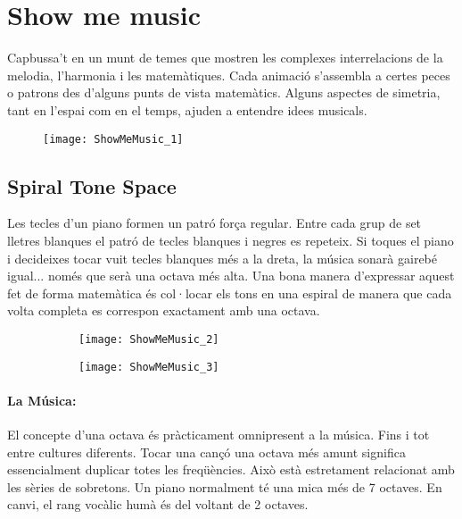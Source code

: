 \section{Show me music}
Capbussa't en un munt de temes que mostren les complexes interrelacions de la melodia, l'harmonia i les matemàtiques. Cada animació s'assembla a certes peces o patrons des d'alguns punts de vista matemàtics. Alguns aspectes de simetria, tant en l'espai com en el temps, ajuden a entendre idees musicals.

\begin{figure}[!h]
\centering
\texttt{[image: ShowMeMusic\_1]}
\end{figure}

\subsection{Spiral Tone Space}
Les tecles d'un piano formen un patró força regular. Entre cada grup de set lletres blanques el patró de tecles blanques i negres es repeteix. Si toques el piano i decideixes tocar vuit tecles blanques més a la dreta, la música sonarà gairebé igual... només que serà una octava més alta. Una bona manera d'expressar aquest fet de forma matemàtica és col·locar els tons en una espiral de manera que cada volta completa es correspon exactament amb una octava.

\begin{figure}[h]
\centering
\begin{subfigure}{0.45\textwidth}
\centering
\texttt{[image: ShowMeMusic\_2]}
\end{subfigure}
\begin{subfigure}{0.45\textwidth}
\centering
\texttt{[image: ShowMeMusic\_3]}
\end{subfigure}
\end{figure}


\paragraph{La Música:} El concepte d'una octava és pràcticament omnipresent a la música. Fins i tot entre cultures diferents. Tocar una cançó una octava més amunt significa essencialment duplicar totes les freqüències. Això està estretament relacionat amb les sèries de sobretons. Un piano normalment té una mica més de 7 octaves. En canvi, el rang vocàlic humà és del voltant de 2 octaves.


